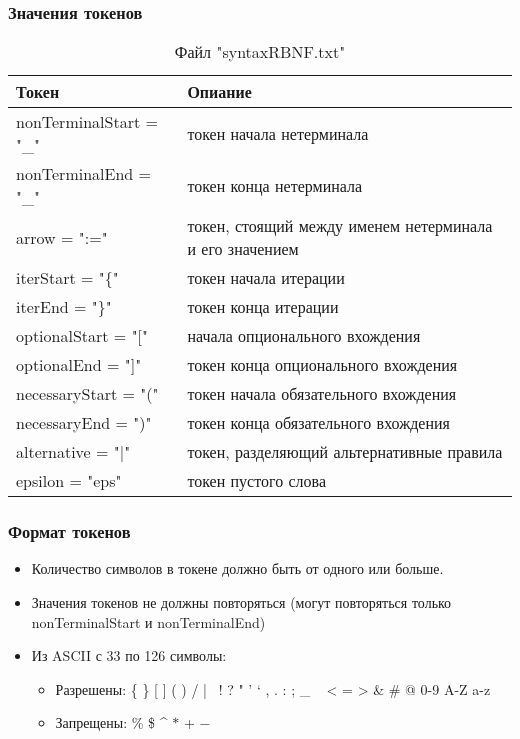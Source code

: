 \documentclass[12pt]{article}
\begin{document}
    \subsubsection*{Значения токенов}
    \begin{table}[hbt!]
        \begin{tabular}{|l|l|}
            \hline
            Токен & Опиание \\
            \hline
            nonTerminalStart = "\_" & токен начала нетерминала \\
            nonTerminalEnd = "\_" & токен конца нетерминала \\
            arrow = ":=" & токен, стоящий между именем нетерминала и его значением \\
            iterStart = "\{" & токен начала итерации \\
            iterEnd = "\}" & токен конца итерации \\
            optionalStart = "[" & начала опционального вхождения \\
            optionalEnd = "]" & токен конца опционального вхождения \\
            necessaryStart = "(" & токен начала обязательного вхождения \\
            necessaryEnd = ")" & токен конца обязательного вхождения \\
            alternative = "$|$" & токен, разделяющий альтернативные правила \\
            epsilon = "eps" & токен пустого слова \\
            \hline
        \end{tabular}
        \caption{Файл "syntaxRBNF.txt"}
    \end{table}

    \subsubsection*{Формат токенов}
    \begin{itemize}
        \item Количество символов в токене должно быть от одного или больше.
        \item Значения токенов не должны повторяться (могут повторяться только nonTerminalStart и nonTerminalEnd)
        \item Из ASCII с 33 по 126 символы:
        \begin{itemize}
            \item Разрешены:   \{ \} [ ] ( ) / | \ ! ? " ' ` , . : ; \_ ~ < = > \& \# @ 0-9 A-Z a-z
            \item Запрещены:  \% \$ \^{} $\ast$ + $-$
        \end{itemize}
    \end{itemize}
\end{document}
